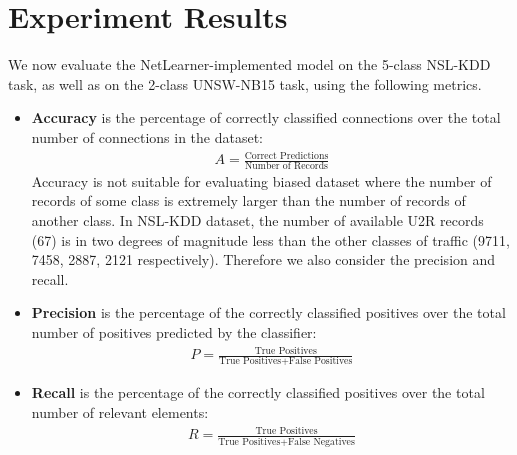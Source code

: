 \section{Experiment Results}

We now evaluate the NetLearner-implemented model on the 5-class NSL-KDD task,
as well as on the 2-class UNSW-NB15 task, using the following metrics.
\begin{itemize}
    \item \textbf{Accuracy} is the percentage of correctly classified connections
        over the total number of connections in the dataset:
        \begin{align}
            A = \frac{\text{Correct Predictions}}{\text{Number of Records}}
        \end{align} 
        Accuracy is not suitable for evaluating biased dataset where the number
        of records of some class is extremely larger than the number of
        records of another class.
        In NSL-KDD dataset, the number of available U2R records (67)
        is in two degrees of magnitude less than the other classes of traffic
        (9711, 7458, 2887, 2121 respectively).
        Therefore we also consider the precision and recall.
    \item \textbf{Precision} is the percentage of the correctly classified positives over
        the total number of positives predicted by the classifier:
                \begin{align}
                    P = \frac{\text{True Positives}}{\text{True Positives} + \text{False Positives}}
                \end{align}
    \item \textbf{Recall} is the percentage of the correctly classified positives over
        the total number of relevant elements:
                \begin{align}
                    R = \frac{\text{True Positives}}{\text{True Positives} + \text{False Negatives}}
                \end{align}
\end{itemize}

